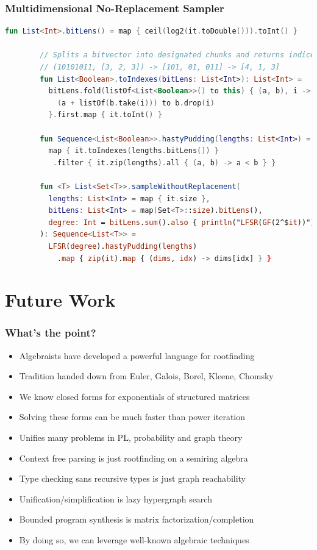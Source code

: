 \documentclass{beamer}
\begin{document}
    \begin{frame}[fragile]
        \frametitle{Multidimensional No-Replacement Sampler}

        \begin{lstlisting}[language=Kotlin, gobble=8]
        fun List<Int>.bitLens() = map { ceil(log2(it.toDouble())).toInt() }

        // Splits a bitvector into designated chunks and returns indices
        // (10101011, [3, 2, 3]) -> [101, 01, 011] -> [4, 1, 3]
        fun List<Boolean>.toIndexes(bitLens: List<Int>): List<Int> =
          bitLens.fold(listOf<List<Boolean>>() to this) { (a, b), i ->
            (a + listOf(b.take(i))) to b.drop(i)
          }.first.map { it.toInt() }

        fun Sequence<List<Boolean>>.hastyPudding(lengths: List<Int>) =
          map { it.toIndexes(lengths.bitLens()) }
           .filter { it.zip(lengths).all { (a, b) -> a < b } }

        fun <T> List<Set<T>>.sampleWithoutReplacement(
          lengths: List<Int> = map { it.size },
          bitLens: List<Int> = map(Set<T>::size).bitLens(),
          degree: Int = bitLens.sum().also { println("LFSR(GF(2^$it))") }
        ): Sequence<List<T>> =
          LFSR(degree).hastyPudding(lengths)
            .map { zip(it).map { (dims, idx) -> dims[idx] } }
        \end{lstlisting}
    \end{frame}

    \section{Future Work}

    \begin{frame}
        \frametitle{What's the point?}
        \begin{itemize}
            \item Algebraists have developed a powerful language for rootfinding
            \item Tradition handed down from Euler, Galois, Borel, Kleene, Chomsky
            \item We know closed forms for exponentials of structured matrices
            \item Solving these forms can be much faster than power iteration
            \item Unifies many problems in PL, probability and graph theory
            \item Context free parsing is just rootfinding on a semiring algebra
            \item Type checking sans recursive types is just graph reachability
            \item Unification/simplification is lazy hypergraph search
            \item Bounded program synthesis is matrix factorization/completion
            \item By doing so, we can leverage well-known algebraic techniques
        \end{itemize}
    \end{frame}
\end{document}
